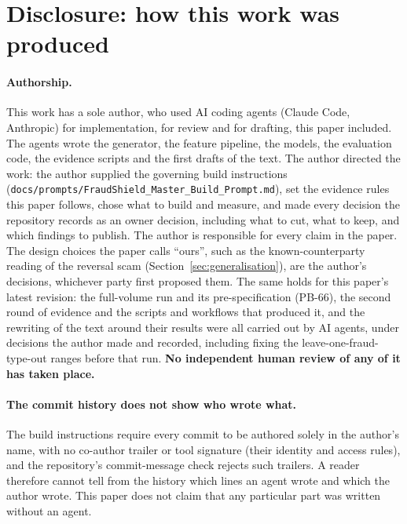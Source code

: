 \section{Disclosure: how this work was produced}
\label{sec:disclosure}

\paragraph{Authorship.} This work has a sole author, who used AI coding agents (Claude Code,
Anthropic) for implementation, for review and for drafting, this paper included. The agents wrote
the generator, the feature pipeline, the models, the evaluation code, the evidence scripts and the
first drafts of the text. The author directed the work: the author supplied the governing build
instructions (\texttt{docs/prompts/FraudShield\_Master\_Build\_Prompt.md}), set the evidence rules
this paper follows, chose what to build and measure, and made every decision the repository records
as an owner decision, including what to cut, what to keep, and which findings to publish. The author
is responsible for every claim in the paper. The design choices the paper calls ``ours'', such as
the known-counterparty reading of the reversal scam (Section~\ref{sec:generalisation}), are the
author's decisions, whichever party first proposed them. The same holds for this paper's latest
revision: the full-volume run and its pre-specification (PB-66), the second round of evidence and the
scripts and workflows that produced it, and the rewriting of the text around their results were all
carried out by AI agents, under decisions the author made and recorded, including fixing
the leave-one-fraud-type-out ranges before that run. \textbf{No independent human review of any of
it has taken place.}

\paragraph{The commit history does not show who wrote what.} The build instructions require every
commit to be authored solely in the author's name, with no co-author trailer or tool signature
(their identity and access rules), and the repository's commit-message check rejects such trailers. A reader therefore
cannot tell from the history which lines an agent wrote and which the author wrote. This paper does
not claim that any particular part was written without an agent.


